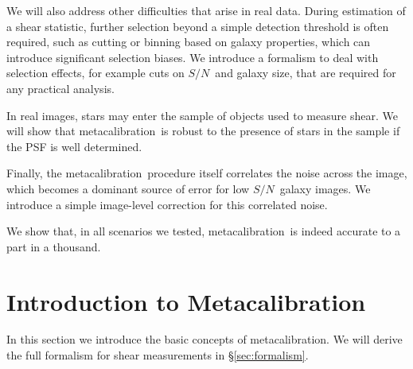 \documentclass[iop]{emulateapj}
\newcommand{\snr}{$S/N$}
\newcommand{\mcal}{metacalibration}
\begin{document}
We will also address other difficulties that arise in real data.  During
estimation of a shear statistic, further selection beyond a simple detection
threshold is often required, such as cutting or binning based on galaxy
properties, which can introduce significant selection biases.  We introduce a
formalism to deal with selection effects, for example cuts on \snr\ and galaxy
size, that are required for any practical analysis. 

In real images, stars may enter the sample of objects used to measure shear. We
will show that \mcal\ is robust to the presence of stars in the sample if the
PSF is well determined.


Finally, the \mcal\ procedure itself correlates the noise across the image,
which becomes a dominant source of error for low \snr\ galaxy images.  We
introduce a simple image-level correction for this correlated noise.

We show that, in all scenarios we tested, \mcal\ is indeed accurate to a part
in a thousand.

\section{Introduction to Metacalibration} \label{sec:mcal}

In this section we introduce the basic concepts of \mcal. We will derive the
full formalism for shear measurements in \S \ref{sec:formalism}.
\end{document}
